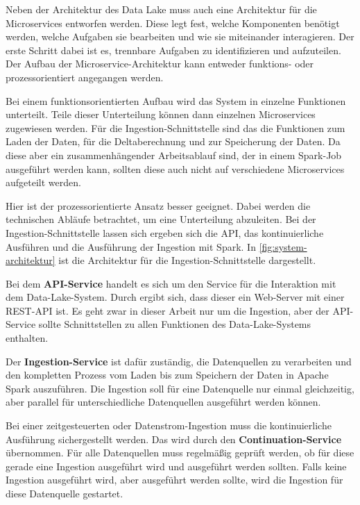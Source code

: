 Neben der Architektur des Data Lake muss auch eine Architektur für die Microservices entworfen werden.
Diese legt fest, welche Komponenten benötigt werden, welche Aufgaben sie bearbeiten und wie sie miteinander interagieren.
Der erste Schritt dabei ist es, trennbare Aufgaben zu identifizieren und aufzuteilen.
Der Aufbau der Microservice-Architektur kann entweder funktions- oder prozessorientiert angegangen werden.

Bei einem funktionsorientierten Aufbau wird das System in einzelne Funktionen unterteilt.
Teile dieser Unterteilung können dann einzelnen Microservices zugewiesen werden.
Für die Ingestion-Schnittstelle sind das die Funktionen zum Laden der Daten, für die Deltaberechnung und zur Speicherung der Daten.
Da diese aber ein zusammenhängender Arbeitsablauf sind, der in einem Spark-Job ausgeführt werden kann, sollten diese auch nicht auf verschiedene Microservices aufgeteilt werden.

Hier ist der prozessorientierte Ansatz besser geeignet.
Dabei werden die technischen Abläufe betrachtet, um eine Unterteilung abzuleiten.
Bei der Ingestion-Schnittstelle lassen sich ergeben sich die API, das kontinuierliche Ausführen und die Ausführung der Ingestion mit Spark.
In \cref{fig:system-architektur} ist die Architektur für die Ingestion-Schnittstelle dargestellt.

Bei dem \textbf{API-Service} handelt es sich um den Service für die Interaktion mit dem Data-Lake-System.
Durch  ergibt sich, dass dieser ein Web-Server mit einer REST-API ist.
Es geht zwar in dieser Arbeit nur um die Ingestion, aber der API-Service sollte Schnittstellen zu allen Funktionen des Data-Lake-Systems enthalten.

Der \textbf{Ingestion-Service} ist dafür zuständig, die Datenquellen zu verarbeiten und den kompletten Prozess vom Laden bis zum Speichern der Daten in Apache Spark auszuführen.
Die Ingestion soll für eine Datenquelle nur einmal gleichzeitig, aber parallel für unterschiedliche Datenquellen ausgeführt werden können.

Bei einer zeitgesteuerten oder Datenstrom-Ingestion muss die kontinuierliche Ausführung sichergestellt werden.
Das wird durch den \textbf{Continuation-Service} übernommen.
Für alle Datenquellen muss regelmäßig geprüft werden, ob für diese gerade eine Ingestion ausgeführt wird und ausgeführt werden sollten.
Falls keine Ingestion ausgeführt wird, aber ausgeführt werden sollte, wird die Ingestion für diese Datenquelle gestartet.

